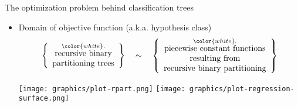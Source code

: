 \begin{frame}{\vskip -0.2cm \large The optimization problem behind classification trees}

\large
\begin{itemize}
\item
	{\Large Domain of objective function} {\small (a.k.a. hypothesis class)}
	{\scriptsize\begin{equation*}
	\left\{\begin{array}{c}
		\overset{{\color{white}.}}{\textnormal{recursive binary}} \\
		\textnormal{partitioning trees}
	\end{array}\right\}
	\quad\sim\quad
	\left\{\begin{array}{c}
		\overset{{\color{white}.}}{\textnormal{piecewise constant functions}} \\
		\textnormal{resulting from} \\
		\textnormal{recursive binary partitioning}
	\end{array}\right\}
	\end{equation*}}
	\begin{center}
	\texttt{[image: graphics/plot-rpart.png]}
	\quad\quad\quad\quad\;\;
	\texttt{[image: graphics/plot-regression-surface.png]}
	\;\;{\color{white}1}
	\end{center}
\end{itemize}


\end{frame}
\normalsize


